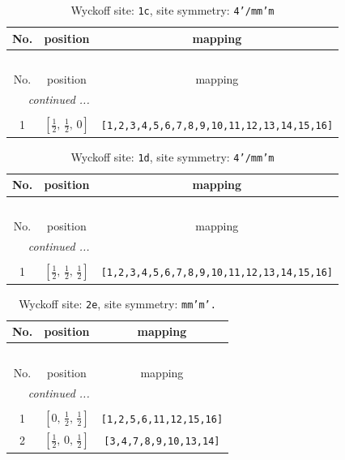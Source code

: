 \documentclass[fleqn,8pt]{jsarticle}
\begin{document}
\begin{longtable}{ccc}
\caption{Wyckoff site: {\tt 1c}, site symmetry: {\tt 4'/mm'm}}
 \\
 \hline \hline
No. & position & mapping \\ \hline \endfirsthead

\multicolumn{2}{l}{\tablename\ \thetable{}} \\
 \hline \hline
No. & position & mapping \\ \hline \endhead

 \hline \hline
\multicolumn{2}{r}{\footnotesize\it continued ...} \\ \endfoot

 \hline \hline
\multicolumn{2}{r}{} \\ \endlastfoot

1 & $\left[ \frac{1}{2},\, \frac{1}{2},\, 0 \right]$ & {\tt [1,2,3,4,5,6,7,8,9,10,11,12,13,14,15,16]} \\
\end{longtable}
\renewcommand{\arraystretch}{1.2}
\begin{longtable}{ccc}
\caption{Wyckoff site: {\tt 1d}, site symmetry: {\tt 4'/mm'm}}
 \\
 \hline \hline
No. & position & mapping \\ \hline \endfirsthead

\multicolumn{2}{l}{\tablename\ \thetable{}} \\
 \hline \hline
No. & position & mapping \\ \hline \endhead

 \hline \hline
\multicolumn{2}{r}{\footnotesize\it continued ...} \\ \endfoot

 \hline \hline
\multicolumn{2}{r}{} \\ \endlastfoot

1 & $\left[ \frac{1}{2},\, \frac{1}{2},\, \frac{1}{2} \right]$ & {\tt [1,2,3,4,5,6,7,8,9,10,11,12,13,14,15,16]} \\
\end{longtable}
\renewcommand{\arraystretch}{1.2}
\begin{longtable}{ccc}
\caption{Wyckoff site: {\tt 2e}, site symmetry: {\tt mm'm'.}}
 \\
 \hline \hline
No. & position & mapping \\ \hline \endfirsthead

\multicolumn{2}{l}{\tablename\ \thetable{}} \\
 \hline \hline
No. & position & mapping \\ \hline \endhead

 \hline \hline
\multicolumn{2}{r}{\footnotesize\it continued ...} \\ \endfoot

 \hline \hline
\multicolumn{2}{r}{} \\ \endlastfoot

1 & $\left[ 0,\, \frac{1}{2},\, \frac{1}{2} \right]$ & {\tt [1,2,5,6,11,12,15,16]} \\ \hline
2 & $\left[ \frac{1}{2},\, 0,\, \frac{1}{2} \right]$ & {\tt [3,4,7,8,9,10,13,14]} \\
\end{longtable}
\end{document}
